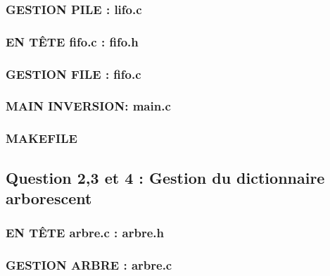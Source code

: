 \documentclass{report}
\begin{document}
\subsubsection{GESTION PILE : lifo.c}
\begin{small}

\end{small}

\subsubsection{EN TÊTE fifo.c : fifo.h}
\begin{small}

\end{small}

\subsubsection{GESTION FILE : fifo.c}
\begin{small}

\end{small}

\subsubsection{MAIN INVERSION: main.c}
\begin{small}

\end{small}

\subsubsection{MAKEFILE}
\begin{small}

\end{small}

\newpage
\subsection{Question 2,3 et 4 : Gestion du dictionnaire arborescent}

\subsubsection{EN TÊTE arbre.c : arbre.h}
\begin{small}

\end{small}

\subsubsection{GESTION ARBRE : arbre.c}
\begin{small}

\end{small}
\end{document}
